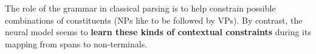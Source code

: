 \documentclass[11pt]{article}
\begin{document}
The role of the grammar in classical parsing is to help constrain possible combinations of constituents (NPs like to be followed by VPs). By contrast, the neural model seems to \textbf{learn these kinds of contextual constraints} during its mapping from spans to non-terminals.
\newpage


\end{document}
